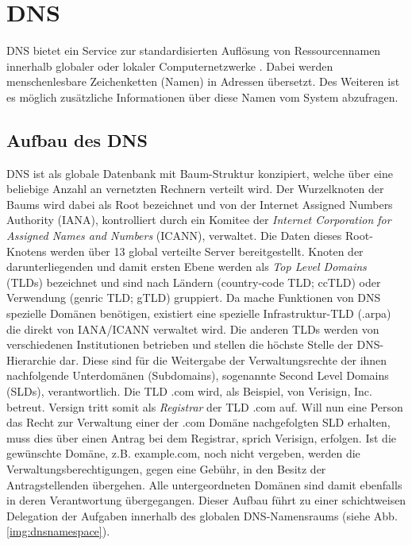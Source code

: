 \chapter{DNS}
\label{chap:dns}

DNS bietet ein Service zur standardisierten Auflösung von Ressourcennamen innerhalb globaler oder lokaler Computernetzwerke \cite{rfc1035}. Dabei werden menschenlesbare Zeichenketten (Namen) in Adressen übersetzt. Des Weiteren ist es möglich zusätzliche Informationen über diese Namen vom System abzufragen.

\section{Aufbau des DNS}

DNS ist als globale Datenbank mit Baum-Struktur konzipiert, welche über eine beliebige Anzahl an vernetzten Rechnern verteilt wird. Der Wurzelknoten der Baums wird dabei als Root bezeichnet und von der Internet Assigned Numbers Authority (IANA), kontrolliert durch ein Komitee der \textit{Internet Corporation for Assigned Names and Numbers} (ICANN), verwaltet. Die Daten dieses Root-Knotens werden über 13 global verteilte Server bereitgestellt. 
Knoten der darunterliegenden und damit ersten Ebene werden als \textit{Top Level Domains} (TLDs) bezeichnet und sind nach Ländern (country-code TLD; ccTLD) oder Verwendung (genric TLD; gTLD) gruppiert. Da mache Funktionen von DNS spezielle Domänen benötigen, existiert eine spezielle Infrastruktur-TLD (.arpa) die direkt von IANA/ICANN verwaltet wird. Die anderen TLDs werden von verschiedenen Institutionen betrieben und stellen die höchste Stelle der DNS-Hierarchie dar. Diese sind für die Weitergabe der Verwaltungsrechte der ihnen nachfolgende Unterdomänen (Subdomains), sogenannte Second Level Domains (SLDs), verantwortlich. Die TLD .com wird, als Beispiel, von Verisign, Inc. betreut. Versign tritt somit als \textit{Registrar} der TLD .com auf. Will nun eine Person das Recht zur Verwaltung einer der .com Domäne nachgefolgten SLD erhalten, muss dies über einen Antrag bei dem Registrar, sprich Verisign, erfolgen. Ist die gewünschte Domäne, z.B. example.com, noch nicht vergeben, werden die Verwaltungsberechtigungen, gegen eine Gebühr, in den Besitz der Antragstellenden übergehen. Alle untergeordneten Domänen sind damit ebenfalls in deren Verantwortung übergegangen. Dieser Aufbau führt zu einer schichtweisen Delegation der Aufgaben innerhalb des globalen DNS-Namensraums (siehe Abb. \ref{img:dnsnamespace}). 

